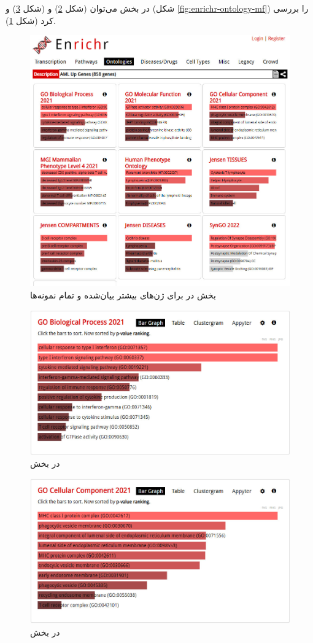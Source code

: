 \documentclass{article}
\begin{document}
در بخش  می‌توان  (شکل \ref{fig:enrichr-ontology-bp}) و  (شکل \ref{fig:enrichr-ontology-cc}) و  (شکل \ref{fig:enrichr-ontology-mf}) را بررسی کرد (شکل \ref{fig:enrichr-ontology}).
\begin{figure}[h!]
	\centering
	\includegraphics[width=0.5\columnwidth]{figs/enrichr-ontologies.jpg}
	\caption{بخش  در  برای ژن‌های بیشتر بیان‌شده و تمام نمونه‌ها}
	\label{fig:enrichr-ontology}
\end{figure}

\begin{figure}[h!]
	\centering
	\includegraphics[width=0.5\columnwidth]{figs/enrichr-ontologies-bp.jpg}
	\caption{ در بخش }
	\label{fig:enrichr-ontology-bp}
\end{figure}

\begin{figure}[h!]
	\centering
	\includegraphics[width=0.5\columnwidth]{figs/enrichr-ontologies-cc.jpg}
	\caption{ در بخش }
	\label{fig:enrichr-ontology-cc}
\end{figure}
\end{document}

